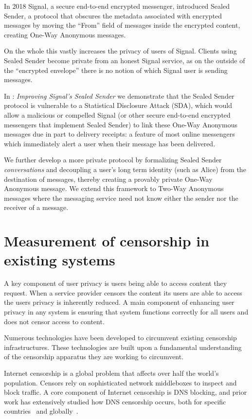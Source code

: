 In 2018 Signal, a secure end-to-end encrypted messenger, introduced Sealed
Sender\cite{sealed-sender}, a protocol that obscures the metadata associated
with encrypted messages by moving the ``From'' field of messages inside the
encrypted content, creating One-Way Anonymous messages.

On the whole this vastly increases the privacy of users of Signal. Clients using
Sealed Sender become private from an honest Signal service, as on the outside of
the ``encrypted envelope'' there is no notion of which Signal user is sending
messages.

In : \emph{Improving Signal's Sealed Sender} we demonstrate that
the Sealed Sender protocol is vulnerable to a Statistical Disclosure Attack
(SDA), which would allow a malicious or compelled Signal (or other secure
end-to-end encrypted messengers that implement Sealed Sender) to link these
One-Way Anonymous messages due in part to delivery receipts: a feature of most
online messengers which immediately alert a user when their message has been
delivered.

We further develop a more private protocol by formalizing Sealed Sender
\emph{conversations} and decoupling a user's long term identity (such as Alice)
from the destination of messages, thereby creating a provably private One-Way
Anonymous message. We extend this framework to Two-Way Anonymous messages where
the messaging service need not know either the sender nor the receiver of a
message. 

\section{Measurement of censorship in existing systems}
A key component of user privacy is users being able to access content they
request. When a service provider censors the content its users are able to
access the users privacy is inherently reduced. A main component of enhancing
user privacy in any system is ensuring that system functions correctly for all
users and does not censor access to content.

Numerous technologies have been developed to circumvent existing censorship
infrastructures. These technologies are built upon a fundamental understanding
of the censorship apparatus they are working to circumvent. 

Internet censorship is a global problem that affects over half the world's
population. Censors rely on sophisticated network middleboxes to inspect and
block traffic. A core component of Internet censorship is DNS blocking, and
prior work has extensively studied how DNS censorship occurs, both for specific
countries~\cite{Anonymous2020:TripletCensors,USESEC21:GFWatch} and
globally~\cite{kuhrer2015going,dagon2008corrupted,pearce2017global,scott2016satellite}.

